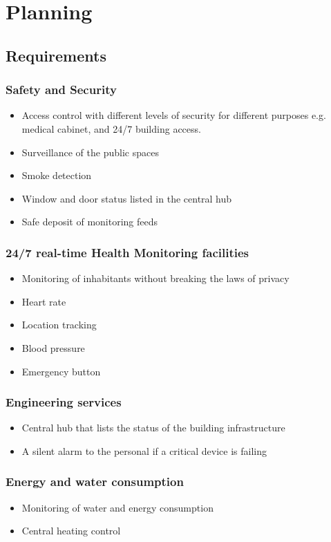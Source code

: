 \newcommand\tabrotate[1]{\rotatebox{90}{#1\hspace{\tabcolsep}}}
\chapter{Planning}
\label{sec:org2610146}
\section{Requirements}
\label{sec:org945b9f4}
\subsection{Safety and Security}
\label{sec:org34def69}
\begin{itemize}
\item Access control with different levels of security for different purposes e.g. medical cabinet, and 24/7 building access.
\item Surveillance of the public spaces
\item Smoke detection
\item Window and door status listed in the central hub
\item Safe deposit of monitoring feeds
\end{itemize}
\subsection{24/7 real-time Health Monitoring facilities}
\label{sec:orge43b7b8}
\begin{itemize}
\item Monitoring of inhabitants without breaking the laws of privacy
\item Heart rate
\item Location tracking
\item Blood pressure
\item Emergency button
\end{itemize}
\subsection{Engineering services}
\label{sec:org3b95898}
\begin{itemize}
\item Central hub that lists the status of the building infrastructure 
\item A silent alarm to the personal if a critical device is failing
\end{itemize}
\subsection{Energy and water consumption}
\label{sec:orgd85891f}
\begin{itemize}
\item Monitoring of water and energy consumption
\item Central heating control
\end{itemize}
